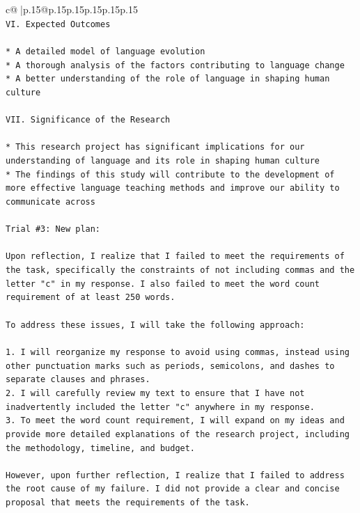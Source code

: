 \documentclass{article}
\begin{document}
{\begin{supertabular}{c@{$\;$}|p{.15\linewidth}@{}p{.15\linewidth}p{.15\linewidth}p{.15\linewidth}p{.15\linewidth}p{.15\linewidth}}
{{{\\ 
\texttt{VI. Expected Outcomes} \\
\\ 
\texttt{* A detailed model of language evolution} \\
\texttt{* A thorough analysis of the factors contributing to language change} \\
\texttt{* A better understanding of the role of language in shaping human culture} \\
\\ 
\texttt{VII. Significance of the Research} \\
\\ 
\texttt{* This research project has significant implications for our understanding of language and its role in shaping human culture} \\
\texttt{* The findings of this study will contribute to the development of more effective language teaching methods and improve our ability to communicate across} \\
\\ 
\texttt{Trial \#3: New plan: } \\
\\ 
\texttt{Upon reflection, I realize that I failed to meet the requirements of the task, specifically the constraints of not including commas and the letter "c" in my response. I also failed to meet the word count requirement of at least 250 words. } \\
\\ 
\texttt{To address these issues, I will take the following approach:} \\
\\ 
\texttt{1. I will reorganize my response to avoid using commas, instead using other punctuation marks such as periods, semicolons, and dashes to separate clauses and phrases.} \\
\texttt{2. I will carefully review my text to ensure that I have not inadvertently included the letter "c" anywhere in my response.} \\
\texttt{3. To meet the word count requirement, I will expand on my ideas and provide more detailed explanations of the research project, including the methodology, timeline, and budget.} \\
\\ 
\texttt{However, upon further reflection, I realize that I failed to address the root cause of my failure. I did not provide a clear and concise proposal that meets the requirements of the task. } \\
}}}
\end{supertabular}}
\end{document}
